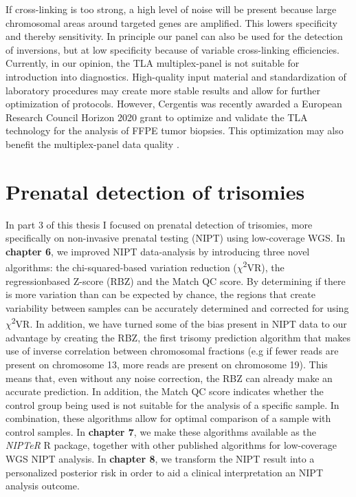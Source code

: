 If cross-linking is too strong, a high level of noise will be present because large chromosomal areas around targeted genes are amplified. 
This lowers specificity and thereby sensitivity. 
In principle our panel can also be used for the detection of inversions, but at low specificity because of variable cross-linking efficiencies. 
Currently, in our opinion, the TLA multiplex-panel is not suitable for introduction into diagnostics. 
High-quality input material and standardization of laboratory procedures may create more stable results and allow for further optimization of protocols. 
However, Cergentis was recently awarded a European Research Council Horizon 2020 grant to optimize and validate the TLA technology for the analysis of FFPE tumor biopsies. 
This optimization may also benefit the multiplex-panel data quality \cite{Cergentis_2018}.

\section{Prenatal detection of trisomies} \label{Prenatal}
In part 3 of this thesis I focused on prenatal detection of trisomies, more specifically on non-invasive prenatal testing (NIPT) using low-coverage WGS. 
In \textbf{chapter 6}, we improved NIPT data-analysis by introducing three novel algorithms: the chi-squared-based variation reduction ($\chi$\textsuperscript{2}VR), the regressionbased Z-score (RBZ) and the Match QC score. 
By determining if there is more variation than can be expected by chance, the regions that create variability between samples can be accurately determined and corrected for using $\chi$\textsuperscript{2}VR.
In addition, we have turned some of the bias present in NIPT data to our advantage by creating the RBZ, the first trisomy prediction algorithm that makes use of inverse correlation between chromosomal fractions (e.g if fewer reads are present on chromosome 13, more reads are present on chromosome 19).
This means that, even without any noise correction, the RBZ can already make an accurate prediction. 
In addition, the Match QC score indicates whether the control group being used is not suitable for the analysis of a specific sample. 
In combination, these algorithms allow for optimal comparison of a sample with control samples. 
In \textbf{chapter 7}, we make these algorithms available as the \textsl{NIPTeR} R package, together with other published algorithms for low-coverage WGS NIPT analysis. 
In \textbf{chapter 8}, we transform the NIPT result into a personalized posterior risk in order to aid a clinical interpretation an NIPT analysis outcome.

